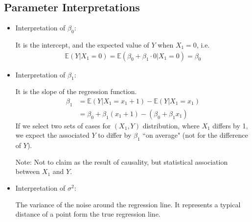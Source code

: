 \documentclass{article}
\newcommand{\E}{\mathbb{E}}
\begin{document}
\subsection{Parameter Interpretations}
\begin{itemize}
    \item Interpretation of $\beta_0$:
    
    It is the intercept, and the expected value of $Y$ when $X_1 = 0$, i.e.
    \begin{align}
        \E(Y|X_1 = 0) = \E(\beta_0 + \beta_1 \cdot 0 | X_1 = 0) = \beta_0
    \end{align}
    \item Interpretation of $\beta_1$:
    
    It is the slope of the regression function.
    \begin{align}
        \beta_1 &= \E(Y | X_1 = x_1 + 1) - \E(Y | X_1 = x_1)\\
        &= \beta_0 + \beta_1(x_1 + 1) - (\beta_0 + \beta_1x_1)
    \end{align}
    If we select two sets of cases for $(X_1,Y)$ distribution, where $X_1$ differs by 1, we expect the associated $Y$ to differ by $\beta_1$ ``on average" (not for the difference of $Y$).
    
    Note: Not to claim as the result of causality, but statistical association between $X_1$ and $Y$.
    \item Interpretation of $\sigma^2$:
    
    The variance of the noise around the regression line. It represents a typical distance of a point form the true regression line.
\end{itemize}
\end{document}
